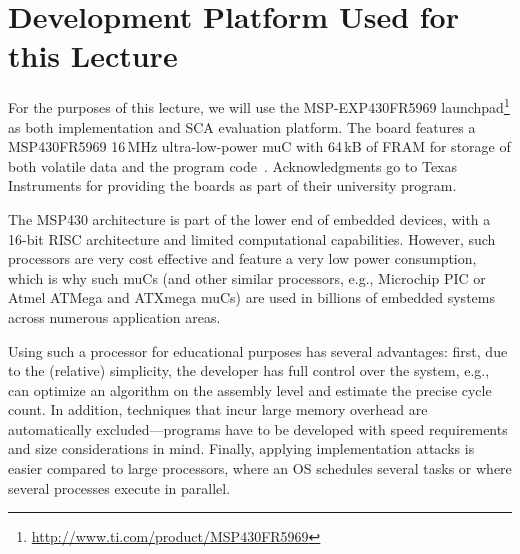 \section{Development Platform Used for this Lecture}
For the purposes of this lecture, we will use the MSP-EXP430FR5969 launchpad\footnote{\url{http://www.ti.com/product/MSP430FR5969}} as both implementation and \ac{SCA} evaluation platform. The board features a MSP430FR5969 16\,MHz ultra-low-power \ac{muC} with 64\,kB of \ac{FRAM} for storage of both volatile data and the program code~\cite{msp_datasheet}. Acknowledgments go to Texas Instruments for providing the boards as part of their university program. 

The MSP430 architecture is part of the lower end of embedded devices, with a 16-bit \ac{RISC} architecture and limited computational capabilities. However, such processors are very cost effective and feature a very low power consumption, which is why such \acp{muC} (and other similar processors, e.g., Microchip PIC or Atmel ATMega and ATXmega \acp{muC}) are used in billions of embedded systems across numerous application areas.

Using such a processor for educational purposes has several advantages: first, due to the (relative) simplicity, the developer has full control over the system, e.g., can optimize an algorithm on the assembly level and estimate the precise cycle count. In addition, techniques that incur large memory overhead are automatically excluded---programs have to be developed with speed requirements and size considerations in mind. Finally, applying implementation attacks is easier compared to large processors, where an \ac{OS} schedules several tasks or where several processes execute in parallel.





